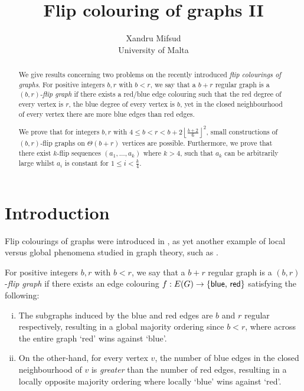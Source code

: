 \documentclass[a4paper,12pt]{article}
\title{Flip colouring of graphs II}
\author{Xandru Mifsud \\ University of Malta}
\date{}
\begin{document}

\maketitle

\begin{abstract}
We give results concerning two problems on the recently introduced \textit{flip colourings of graphs}. For positive integers $b, r$ with $b < r$, we say that a $b + r$ regular graph is a $(b,r)$-\textit{flip graph} if there exists a red/blue edge colouring such that the red degree of every vertex is $r$, the blue degree of every vertex is $b$, yet in the closed neighbourhood of every vertex there are more blue edges than red edges.

 We prove that for integers $b, r$ with $4 \leq b < r < b + 2 \left\lfloor\frac{b+2}{6}\right\rfloor^2$, small constructions of $(b,r)$-flip graphs on $\Theta(b+r)$ vertices are possible. Furthermore, we prove that there exist $k$-flip sequences $(a_1, \dots, a_k)$ where $k > 4$, such that $a_k$ can be arbitrarily large whilst $a_i$ is constant for $1 \leq i < \frac{k}{4}$. 
\end{abstract}
\section{Introduction}

Flip colourings of graphs were introduced in \cite{caro2023flip}, as yet another example of local versus global phenomena studied in graph theory, such as \cite{ABDULLAH20151, caro2018effect, FISHBURN1986165}. 

For positive integers $b, r$ with $b < r$, we say that a $b + r$ regular graph is a $(b,r)$-\textit{flip graph} if there exists an edge colouring $f: E(G) \rightarrow \{\mbox{\textsf{blue}, \textsf{red}}\}$ satisfying the following:
\begin{enumerate}[i.]
	\item The subgraphs induced by the \textsf{blue} and \textsf{red} edges are $b$ and $r$ regular respectively, resulting in a global majority ordering since $b < r$, where across the entire graph `\textsf{red}' wins against `\textsf{blue}'.
	\item On the other-hand, for every vertex $v$, the number of \textsf{blue} edges in the closed neighbourhood of $v$ is \textit{greater} than the number of \textsf{red} edges, resulting in a locally opposite majority ordering where locally `\textsf{blue}' wins against `\textsf{red}'.
\end{enumerate}
\end{document}
